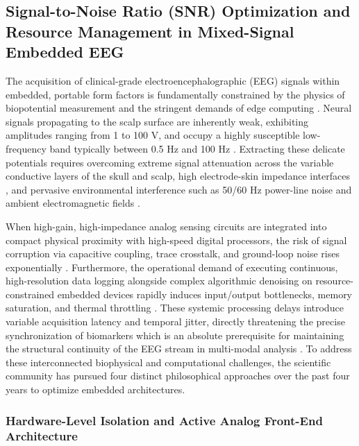 \subsection{Signal-to-Noise Ratio (SNR) Optimization and Resource Management in Mixed-Signal Embedded EEG}

The acquisition of clinical-grade electroencephalographic (EEG) signals within embedded, portable form factors is fundamentally constrained by the physics of biopotential measurement and the stringent demands of edge computing \cite{lyu2026deep}. Neural signals propagating to the scalp surface are inherently weak, exhibiting amplitudes ranging from 1 to 100 \textmu V, and occupy a highly susceptible low-frequency band typically between 0.5 Hz and 100 Hz \cite{singh2023survey}. Extracting these delicate potentials requires overcoming extreme signal attenuation across the variable conductive layers of the skull and scalp, high electrode-skin impedance interfaces \cite{gkintoni2025mapping}, and pervasive environmental interference such as 50/60 Hz power-line noise and ambient electromagnetic fields \cite{zhang2025recent}.

When high-gain, high-impedance analog sensing circuits are integrated into compact physical proximity with high-speed digital processors, the risk of signal corruption via capacitive coupling, trace crosstalk, and ground-loop noise rises exponentially \cite{porto2025bridging}. Furthermore, the operational demand of executing continuous, high-resolution data logging alongside complex algorithmic denoising on resource-constrained embedded devices rapidly induces input/output bottlenecks, memory saturation, and thermal throttling \cite{nguyen2025edge}. These systemic processing delays introduce variable acquisition latency and temporal jitter, directly threatening the precise synchronization of biomarkers which is an absolute prerequisite for maintaining the structural continuity of the EEG stream in multi-modal analysis \cite{iwama2023two}. To address these interconnected biophysical and computational challenges, the scientific community has pursued four distinct philosophical approaches over the past four years to optimize embedded architectures.

\subsubsection{Hardware-Level Isolation and Active Analog Front-End Architecture}

